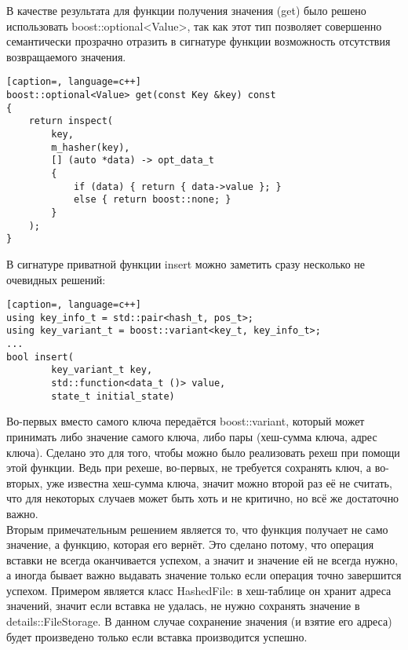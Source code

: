 \documentclass[12pt, a4paper]{fallen_report}
\begin{document}
В качестве результата для функции получения значения ({\consolas get}) было решено использовать {\consolas boost::optional<Value>}, так как этот тип позволяет совершенно семантически прозрачно отразить в сигнатуре функции возможность отсутствия возвращаемого значения.

\begin{lstlisting}[caption=, language=c++]
boost::optional<Value> get(const Key &key) const 
{
    return inspect(
        key,
        m_hasher(key),
        [] (auto *data) -> opt_data_t 
        {
            if (data) { return { data->value }; }
            else { return boost::none; }
        }
    );
}
\end{lstlisting}

В сигнатуре приватной функции {\consolas insert} можно заметить сразу несколько не очевидных решений:
\begin{lstlisting}[caption=, language=c++]
using key_info_t = std::pair<hash_t, pos_t>;
using key_variant_t = boost::variant<key_t, key_info_t>;
...
bool insert(
        key_variant_t key,
        std::function<data_t ()> value,
        state_t initial_state)
\end{lstlisting}

Во-первых вместо самого ключа передаётся {\consolas boost::variant}, который может принимать либо значение самого ключа, либо пары (хеш-сумма ключа, адрес ключа). Сделано это для того, чтобы можно было реализовать рехеш при помощи этой функции. Ведь при рехеше, во-первых, не требуется сохранять ключ, а во-вторых, уже известна хеш-сумма ключа, значит можно второй раз её не считать, что для некоторых случаев может быть хоть и не критично, но всё же достаточно важно.\\
Вторым примечательным решением является то, что функция получает не само значение, а функцию, которая его вернёт. Это сделано потому, что операция вставки не всегда оканчивается успехом, а значит и значение ей не всегда нужно, а иногда бывает важно выдавать значение только если операция точно завершится успехом. Примером является класс {\consolas HashedFile}: в хеш-таблице он хранит адреса значений, значит если вставка не удалась, не нужно сохранять значение в {\consolas details::FileStorage}. В данном случае сохранение значения (и взятие его адреса) будет произведено только если вставка производится успешно.
\end{document}
